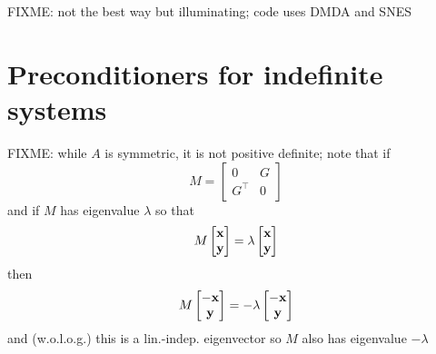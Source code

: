 FIXME: not the best way but illuminating; code uses DMDA and SNES

\section{Preconditioners for indefinite systems}

FIXME: while $A$ is symmetric, it is not positive definite; note that if
    $$M = \begin{bmatrix} 0 & G \\ G^\top & 0 \end{bmatrix}$$
and if $M$ has eigenvalue $\lambda$ so that
    $$M \begin{bmatrix} \mathbf{x} \\ \mathbf{y} \end{bmatrix} = \lambda \begin{bmatrix} \mathbf{x} \\ \mathbf{y} \end{bmatrix}$$
then
    $$M \begin{bmatrix} -\mathbf{x} \\ \mathbf{y} \end{bmatrix} = - \lambda \begin{bmatrix} -\mathbf{x} \\ \mathbf{y} \end{bmatrix}$$
and (w.o.l.o.g.) this is a lin.-indep. eigenvector so $M$ also has eigenvalue $-\lambda$




